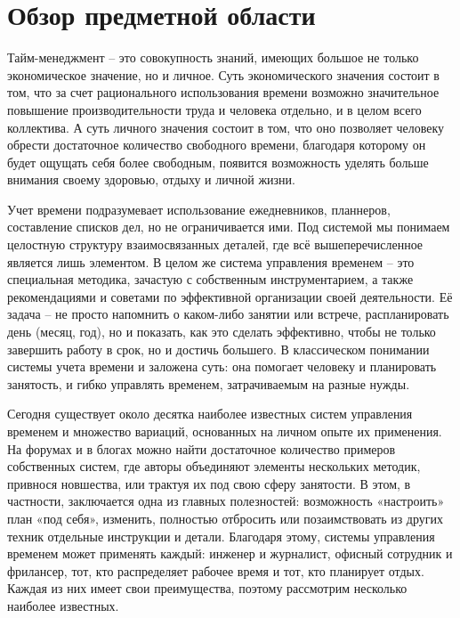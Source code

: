 \lstset{style=phpstyle}

\section{Обзор предметной области}
\label{sec:domain}

Тайм-менеджмент – это совокупность знаний, имеющих большое не только экономическое значение, но и личное. Суть экономического значения состоит в том,
что за счет рационального использования времени возможно значительное повышение производительности труда и человека отдельно, и в целом всего
коллектива. А суть личного значения состоит в том, что оно позволяет человеку обрести достаточное количество свободного времени, благодаря которому он будет
ощущать себя более свободным, появится возможность уделять больше внимания своему здоровью, отдыху и личной жизни.

Учет времени подразумевает использование ежедневников, планнеров, составление списков дел, но не ограничивается ими. Под системой мы понимаем целостную структуру взаимосвязанных деталей, где всё вышеперечисленное является лишь элементом. В целом же система управления временем – это специальная методика, зачастую с собственным инструментарием, а также рекомендациями и советами по эффективной организации своей деятельности. Её задача – не просто напомнить о каком-либо занятии или встрече, распланировать день (месяц, год), но и показать, как это сделать эффективно, чтобы не только завершить работу в срок, но и достичь большего. В классическом понимании системы учета времени и заложена суть: она помогает человеку и планировать занятость, и гибко управлять временем, затрачиваемым на разные нужды.

Сегодня существует около десятка наиболее известных систем управления временем и множество вариаций, основанных на личном опыте их применения. На форумах и в блогах можно найти достаточное количество примеров собственных систем, где авторы объединяют элементы нескольких методик, привнося новшества, или трактуя их под свою сферу занятости. В этом, в частности, заключается одна из главных полезностей: возможность «настроить» план «под себя», изменить, полностью отбросить или позаимствовать из других техник отдельные инструкции и детали. Благодаря этому, системы управления временем может применять каждый: инженер и журналист, офисный сотрудник и фрилансер, тот, кто распределяет рабочее время и тот, кто планирует отдых. Каждая из них имеет свои преимущества, поэтому рассмотрим несколько наиболее известных.



